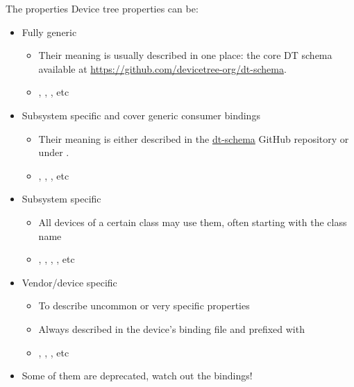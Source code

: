 \begin{frame}[fragile]{The properties}
  Device tree properties can be:
  \begin{itemize}
  \item Fully generic
    \begin{itemize}
    \item Their meaning is usually described in one place: the core DT
      schema available at \url{https://github.com/devicetree-org/dt-schema}.
    \item {}, ,
      {}, etc
    \end{itemize}
  \item Subsystem specific and cover generic consumer bindings
    \begin{itemize}
    \item Their meaning is either described in the
      \href{https://github.com/devicetree-org/dt-schema}{dt-schema}
      GitHub repository or under .
    \item {}, , , etc
    \end{itemize}
  \item Subsystem specific
    \begin{itemize}
    \item All devices of a certain class may use them, often starting
      with the class name
    \item {}, , ,
      , etc
    \end{itemize}
  \item Vendor/device specific
    \begin{itemize}
    \item To describe uncommon or very specific properties
    \item Always described in the device's binding file and prefixed with 
    \item {}, , , etc
    \end{itemize}
  \item Some of them are deprecated, watch out the bindings!
  \end{itemize}
\end{frame}

